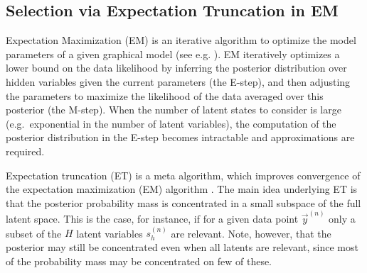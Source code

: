 \subsection{Selection via Expectation Truncation in EM}
Expectation Maximization (EM) is an iterative algorithm to optimize the model parameters of a given graphical model (see e.g. \citep{DempsterEtAl1977, NealHinton1998}).
EM iteratively optimizes a lower bound on the data likelihood by inferring the
posterior distribution over hidden variables given the current parameters (the
E-step), and then adjusting the parameters to maximize the likelihood of the
data averaged over this posterior (the M-step).
%
When the number of latent states to consider is large (e.g.\ exponential in the
number of latent variables), the computation of the posterior distribution in
the E-step becomes intractable and approximations are required.


%
Expectation truncation (ET) is a meta algorithm, which improves convergence of the expectation maximization (EM) algorithm \citep{LuckeEggert2010}.
%
The main idea underlying ET is that the posterior probability mass is concentrated in a small subspace of the full latent space.
This is the case, for instance, if for a given data point $\vec{y}^{(n)}$ 
only a subset of the $H$ latent variables $s_h^{(n)}$ are relevant. Note, however, that the posterior may still be concentrated  even when all latents are relevant, since most of the probability mass may be concentrated on few of these. 

